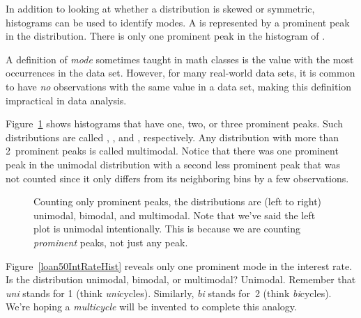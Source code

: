 In addition to looking at whether a distribution is skewed
or symmetric, histograms can be used to identify modes.
A  is represented by a prominent peak in the
distribution.
There is only one prominent peak in the histogram of
.

A definition of \emph{mode} sometimes
taught in math classes is the value with the
most occurrences in the data set.
However, for many real-world data sets, it is common to have
\emph{no} observations with the same value in a data set,
making this definition impractical in data analysis.

Figure~\ref{singleBiMultiModalPlots} shows histograms that
have one, two, or three prominent peaks.
Such distributions are called
,
, and
, respectively.
Any distribution with more than 2~prominent peaks is
called multimodal.
Notice that there was one prominent peak in the unimodal
distribution with a second less prominent peak that was
not counted since it only differs from its neighboring
bins by a few observations.

\begin{figure}[h]
  \centering
  \caption{Counting only prominent peaks, the
      distributions are (left to right) unimodal,
      bimodal, and multimodal.
      Note that we've said the left plot is unimodal
      intentionally.
      This is because we are counting \emph{prominent}
      peaks, not just any peak.}
  \label{singleBiMultiModalPlots}
\end{figure}

\begin{examplewrap}
\begin{nexample}{Figure~\ref{loan50IntRateHist}
    reveals only one prominent mode in the interest rate.
    Is the distribution unimodal, bimodal, or multimodal?}
  Unimodal.
  Remember that \emph{uni} stands for 1 (think \emph{uni}cycles).
  Similarly, \emph{bi} stands for~2 (think \emph{bi}cycles).
  We're hoping a \emph{multicycle} will be invented to complete
  this analogy.
\end{nexample}
\end{examplewrap}

%

